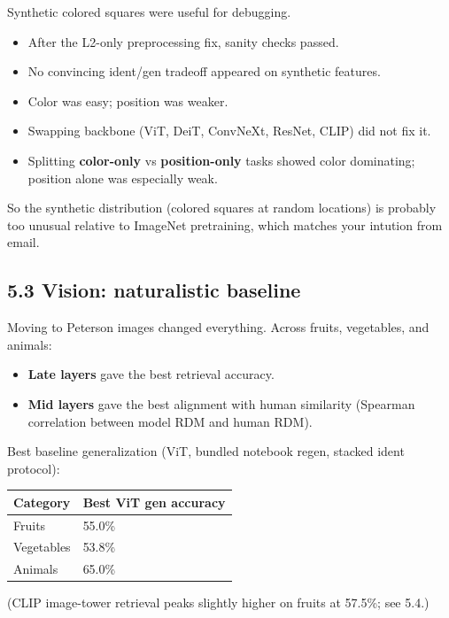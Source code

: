 \documentclass[
  11pt,
]{memoir}
\providecommand{\tightlist}{%
  \setlength{\itemsep}{0pt}\setlength{\parskip}{0pt}}
\begin{document}
Synthetic colored squares were useful for debugging.

\begin{itemize}
\tightlist
\item
  After the L2-only preprocessing fix, sanity checks passed.
\item
  No convincing ident/gen tradeoff appeared on synthetic features.
\item
  Color was easy; position was weaker.
\item
  Swapping backbone (ViT, DeiT, ConvNeXt, ResNet, CLIP) did not fix it.
\item
  Splitting \textbf{color-only} vs \textbf{position-only} tasks showed
  color dominating; position alone was especially weak.
\end{itemize}

So the synthetic distribution (colored squares at random locations) is
probably too unusual relative to ImageNet pretraining, which matches
your intution from email.

\subsection{5.3 Vision: naturalistic
baseline}\label{vision-naturalistic-baseline}

Moving to Peterson images changed everything. Across fruits, vegetables,
and animals:

\begin{itemize}
\tightlist
\item
  \textbf{Late layers} gave the best retrieval accuracy.
\item
  \textbf{Mid layers} gave the best alignment with human similarity
  (Spearman correlation between model RDM and human RDM).
\end{itemize}

Best baseline generalization (ViT, bundled notebook regen, stacked ident
protocol):

\begin{longtable}[]{@{}ll@{}}
\toprule\noalign{}
Category & Best ViT gen accuracy \\
\midrule\noalign{}
\endhead
\bottomrule\noalign{}
\endlastfoot
Fruits & 55.0\% \\
Vegetables & 53.8\% \\
Animals & 65.0\% \\
\end{longtable}

(CLIP image-tower retrieval peaks slightly higher on fruits at 57.5\%;
see 5.4.)
\end{document}
